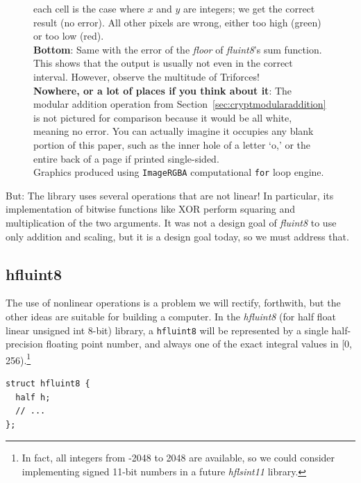 \documentclass[twocolumn]{article}
\begin{document}
\begin{figure}[tp]
{          each cell is the case where $x$ and $y$ are integers; we get
          the correct result (no error). All other pixels are wrong,
          either too high (green) or too low (red).
              \\[1em]
          {\bf Bottom}: Same with the error of the {\em floor} of {\it fluint8}'s
          sum function. This shows that the output is usually not even in the
          correct interval. However, observe the multitude of Triforces!
              \\[1em]
          {\bf Nowhere, or a lot of places if you think about it}: The modular addition
          operation from Section~\ref{sec:cryptmodularaddition} is not
          pictured for comparison because it would be all white, meaning
          no error. You can actually imagine it occupies any blank portion
          of this paper, such as the inner hole of a letter `o,' or the
          entire back of a page if printed single-sided.
              \\[0.25em]
          Graphics produced using {\tt ImageRGBA} computational
          {\tt for} loop engine.
  } \label{fig:adderrordetail}
\end{figure}

But: The library uses several operations that are not linear!
In particular, its implementation of bitwise functions like XOR
perform squaring and multiplication of the two arguments. It
was not a design goal of {\it fluint8} to use only addition and
scaling, but it is a design goal today, so we must address that.

\subsection{hfluint8}

The use of nonlinear operations is a problem we will rectify,
forthwith, but the other ideas are suitable for building a computer.
In the {\it hfluint8} (for half float linear unsigned int 8-bit)
library, a \verb+hfluint8+ will be represented by a single
half-precision floating point number, and always one of the exact
integral values in [0, 256).\footnote{In fact, all integers from -2048
    to 2048 are available, so we could consider implementing signed
    11-bit numbers in a future {\it hflsint11} library.}

\begin{lstlisting}
struct hfluint8 {
  half h;
  // ...
};
\end{lstlisting}
\end{document}
